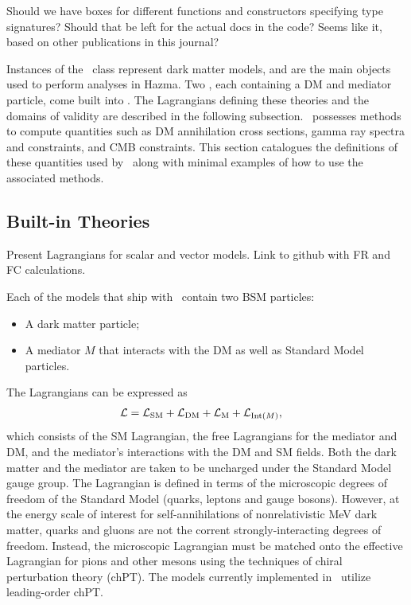 {\color{red} Should we have boxes for different functions and constructors specifying type signatures? Should that be left for the actual docs in the code? Seems like it, based on other publications in this journal?}

Instances of the \theory\ class represent dark matter models, and are the main objects used to perform analyses in Hazma. Two \theory\s, each containing a DM and mediator particle, come built into \hazma. The Lagrangians defining these theories and the domains of validity are described in the following subsection. \theory\ possesses methods to compute quantities such as DM annihilation cross sections, gamma ray spectra and constraints, and CMB constraints. This section catalogues the definitions of these quantities used by \hazma\ along with minimal examples of how to use the associated methods.

\subsection{Built-in Theories}%
\label{sub:built_in_theories}

{\color{red} Present Lagrangians for scalar and vector models. Link to github with FR and FC calculations.}

Each of the models that ship with \hazma\ contain two BSM particles:
\begin{itemize}
    \item A dark matter particle;
    \item A mediator $M$ that interacts with the DM as well as Standard Model particles.
\end{itemize}
The Lagrangians can be expressed as
\begin{align}
    \mathcal{L} &= \mathcal{L}_{\mathrm{SM}} + \mathcal{L}_{\mathrm{DM}} + \mathcal{L}_{\mathrm{M}} + \mathcal{L}_{{\mathrm{Int}}(M)},
\end{align}
which consists of the SM Lagrangian, the free Lagrangians for the mediator and DM, and the mediator's interactions with the DM and SM fields. Both the dark matter and the mediator are taken to be uncharged under the Standard Model gauge group. The Lagrangian is defined in terms of the microscopic degrees of freedom of the Standard Model (quarks, leptons and gauge bosons). However, at the energy scale of interest for self-annihilations of nonrelativistic MeV dark matter, quarks and gluons are not the corrent strongly-interacting degrees of freedom. Instead, the microscopic Lagrangian must be matched onto the effective Lagrangian for pions and other mesons using the techniques of chiral perturbation theory (chPT). The models currently implemented in \hazma\ utilize leading-order chPT. 

